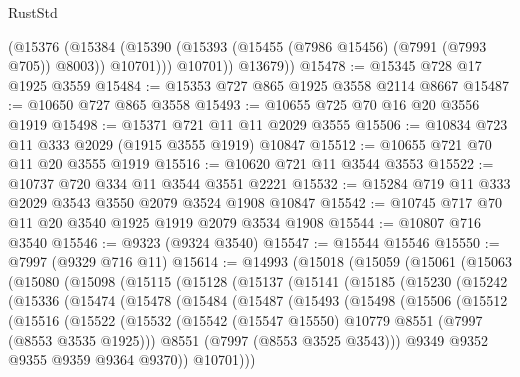 \begin{lexlean}{RustStd}
\begin{coremodule}
{\begin{coremodule}
{{{{{{{{{{{{{{{{{{{{{{{{{{{{{{{{{{{{{{{{{{{            (@15376
              (@15384 (@15390 (@15393 (@15455 (@7986 @15456) (@7991 (@7993 @705)) @8003)) @10701)))
            @10701))
        @13679))
@15478 := @15345 @728 @17 @1925 @3559
@15484 := @15353 @727 @865 @1925 @3558 @2114 @8667
@15487 := @10650 @727 @865 @3558
@15493 := @10655 @725 @70 @16 @20 @3556 @1919
@15498 := @15371 @721 @11 @11 @2029 @3555
@15506 := @10834 @723 @11 @333 @2029 (@1915 @3555 @1919) @10847
@15512 := @10655 @721 @70 @11 @20 @3555 @1919
@15516 := @10620 @721 @11 @3544 @3553
@15522 := @10737 @720 @334 @11 @3544 @3551 @2221
@15532 := @15284 @719 @11 @333 @2029 @3543 @3550 @2079 @3524 @1908 @10847
@15542 := @10745 @717 @70 @11 @20 @3540 @1925 @1919 @2079 @3534 @1908
@15544 := @10807 @716 @3540
@15546 := @9323 (@9324 @3540)
@15547 := @15544 @15546
@15550 := @7997 (@9329 @716 @11)
@15614 := @14993
    (@15018
      (@15059
        (@15061
          (@15063
            (@15080
              (@15098
                (@15115
                  (@15128
                    (@15137
                      (@15141
                        (@15185
                          (@15230
                            (@15242
                              (@15336
                                (@15474
                                  (@15478
                                    (@15484
                                      (@15487
                                        (@15493
                                          (@15498
                                            (@15506
                                              (@15512
                                                (@15516
                                                  (@15522
                                                    (@15532
                                                      (@15542
                                                        (@15547 @15550)
                                                        @10779
                                                        @8551
                                                        (@7997 (@8553 @3535 @1925)))
                                                      @8551
                                                      (@7997 (@8553 @3525 @3543)))
                                                    @9349
                                                    @9352
                                                    @9355
                                                    @9359
                                                    @9364
                                                    @9370))
                                                @10701)))
}}}}}}}}}}}}}}}}}}}}}}}}}}}}}}}}}}}}}}}}}}}
\end{coremodule}}
\end{coremodule}
\end{lexlean}
